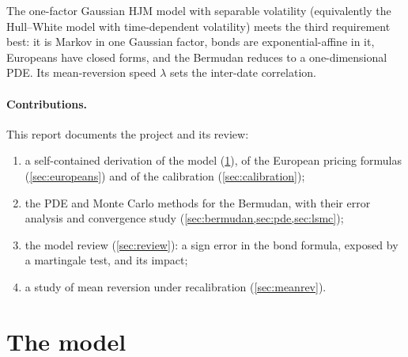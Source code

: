 \documentclass[11pt,a4paper]{article}
\theoremstyle{definition}
\theoremstyle{remark}
\begin{document}
The one-factor Gaussian HJM model with separable volatility (equivalently the Hull--White model with time-dependent
volatility) meets the third requirement best: it is Markov in one Gaussian factor, bonds are exponential-affine in it,
Europeans have closed forms, and the Bermudan reduces to a one-dimensional PDE. Its mean-reversion speed $\lambda$ sets the
inter-date correlation.

\paragraph{Contributions.} This report documents the project and its review:
\begin{enumerate}[nosep]
  \item a self-contained derivation of the model (\cref{sec:model}), of the European pricing formulas (\cref{sec:europeans})
        and of the calibration (\cref{sec:calibration});
  \item the PDE and Monte Carlo methods for the Bermudan, with their error analysis and convergence study
        (\cref{sec:bermudan,sec:pde,sec:lsmc});
  \item the model review (\cref{sec:review}): a sign error in the bond formula, exposed by a martingale test, and its impact;
  \item a study of mean reversion under recalibration (\cref{sec:meanrev}).
\end{enumerate}

\section{The model}\label{sec:model}
\end{document}
